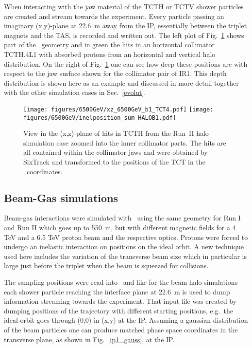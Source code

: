 When interacting with the jaw material of the TCTH or TCTV shower particles are created and stream towards the experiment. Every particle passing an imaginary (x,y)-plane at 22.6~m away from the IP, essentially between the triplet magnets and the TAS, is recorded and written out. The left plot of Fig.~\ref{tctHits} shows part of the \fluka~geometry and in green the hits in an horizontal collimator TCTH.4L1 with absorbed protons from an horizontal and vertical halo distribution. On the right of Fig.~\ref{tctHits} one can see how deep these positions are with respect to the jaw surface shown for the collimator pair of IR1. This depth distribution is shown here as an example and discussed in more detail together with the other simulation cases in Sec.~\ref{evolut}.

\begin{figure}[!htb]
\begin{center}
  \texttt{[image: figures/6500GeV/xz\_6500GeV\_b1\_TCT4.pdf]}
  \texttt{[image: figures/6500GeV/inelposition\_sum\_HALOB1.pdf]}
\end{center}
\vspace{-0.6cm}
 \caption{View in the (x,z)-plane of hits in TCTH from the Run~II halo simulation case zoomed into the inner collimator parts. The hits are all contained within the collimator jaws and were obtained by SixTrack and transformed to the positions of the TCT in the \fluka~coordinates.
  \label{tctHits}}
\end{figure}


\subsection{Beam-Gas simulations}
Beam-gas interactions were simulated with \fluka~using the same geometry for Run I and Run II which goes up to 550~m, but with different magnetic fields for a 4 TeV and a 6.5 TeV proton beam and the respective optics. Protons were forced to undergo an inelastic interaction on positions on the ideal orbit. A new technique used here includes the variation of the transverse beam size which in particular is large just before the triplet when the beam is squeezed for collisions. 

The sampling positions were read into \fluka~and like for the beam-halo simulations each shower particle reaching the interface plane at 22.6~m is used to dump information streaming towards the experiment. That input file was created by dumping positions of the trajectory with different starting positions, e.g.~the ideal orbit goes through (0,0) in (x,y) at the IP. Assuming a gaussian distribution of the beam particles one can produce matched phase space coordinates in the transverse plane, as shown in Fig.~\ref{ip1_gauss}, at the IP.

